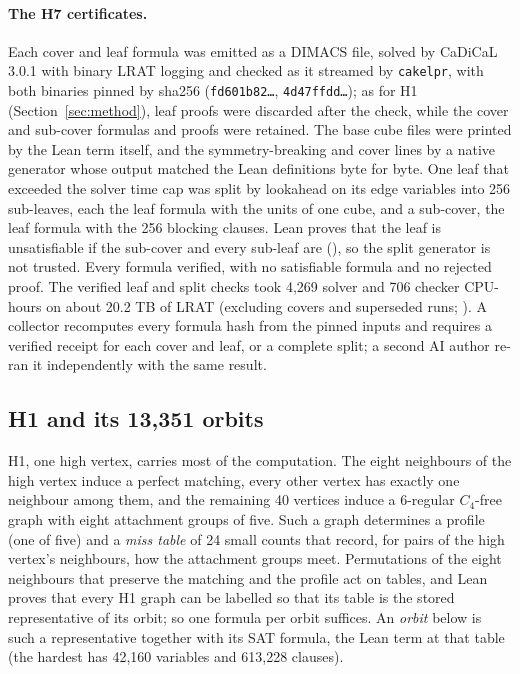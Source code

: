 \documentclass{anvil-paper}
\newcommand{\repocommit}{2029149d7e42b74036ff0e1e82af6d33c2e32748}%
\newcommand{\repocommitshort}{2029149d7e42}
\newcommand{\repobase}{https://github.com/rjwalters/lean-genius/blob/\repocommit}
\newcommand{\repofile}[2]{\href{\repobase/#1}{\lean{#2}}}
\newcommand{\rp}{research/problems/erdos-85-wip-01}
\newcommand{\cakelpr}{\texttt{cake\textunderscore lpr}}
\theoremstyle{definition}
\begin{document}
\paragraph{The H7 certificates.} Each cover and leaf formula was emitted as a DIMACS file, solved by CaDiCaL 3.0.1 \citep{biere2020cadical,biere2024cadical2} with binary LRAT logging and checked as it streamed by \cakelpr{}, with both binaries pinned by sha256 (\texttt{fd601b82\ldots}, \texttt{4d47ffdd\ldots}); as for H1 (Section~\ref{sec:method}), leaf proofs were discarded after the check, while the cover and sub-cover formulas and proofs were retained. The base cube files were printed by the Lean term itself, and the symmetry-breaking and cover lines by a native generator whose output matched the Lean definitions byte for byte. One leaf that exceeded the solver time cap was split by lookahead on its edge variables into 256 sub-leaves, each the leaf formula with the units of one cube, and a sub-cover, the leaf formula with the 256 blocking clauses. Lean proves that the leaf is unsatisfiable if the sub-cover and every sub-leaf are (), so the split generator is not trusted. Every formula verified, with no satisfiable formula and no rejected proof. The verified leaf and split checks took 4,269 solver and 706 checker CPU-hours on about 20.2 TB of LRAT (excluding covers and superseded runs; \repofile{\rp/h7_hsb_campaign_20261008/receipts/collected/campaign_totals.json}{campaign_totals.json}). A collector recomputes every formula hash from the pinned inputs and requires a verified receipt for each cover and leaf, or a complete split; a second AI author re-ran it independently with the same result.

\subsection{H1 and its 13,351 orbits}\label{sec:h1-structure}

H1, one high vertex, carries most of the computation. The eight neighbours of the high vertex induce a perfect matching, every other vertex has exactly one neighbour among them, and the remaining 40 vertices induce a 6-regular $C_4$-free graph with eight attachment groups of five. Such a graph determines a profile (one of five) and a \emph{miss table} of 24 small counts that record, for pairs of the high vertex's neighbours, how the attachment groups meet. Permutations of the eight neighbours that preserve the matching and the profile act on tables, and Lean proves that every H1 graph can be labelled so that its table is the stored representative of its orbit; so one formula per orbit suffices. An \emph{orbit} below is such a representative together with its SAT formula, the Lean term  at that table (the hardest has 42,160 variables and 613,228 clauses).
\end{document}
